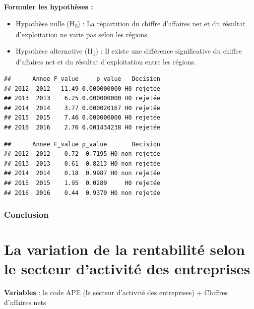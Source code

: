 \documentclass[mstat,12pt]{unswthesis}
\begin{document}
\medskip

\textbf{Formuler les hypothèses :}

\bigskip

\begin{itemize}
\tightlist
\item
  Hypothèse nulle (H\textsubscript{0}) : La répartition du chiffre
  d'affaires net et du résultat d'exploitation ne varie pas selon les
  régions. \medskip
\item
  Hypothèse alternative (H\textsubscript{1}) : Il existe une différence
  significative du chiffre d'affaires net et du résultat d'exploitation
  entre les régions.
\end{itemize}

\begin{verbatim}
##      Annee F_value     p_value   Decision
## 2012  2012   11.49 0.000000000 H0 rejetée
## 2013  2013    6.25 0.000000000 H0 rejetée
## 2014  2014    3.77 0.000020167 H0 rejetée
## 2015  2015    7.46 0.000000000 H0 rejetée
## 2016  2016    2.76 0.001434238 H0 rejetée
\end{verbatim}

\bigskip

\begin{verbatim}
##      Annee F_value p_value       Decision
## 2012  2012    0.72  0.7195 H0 non rejetée
## 2013  2013    0.61  0.8213 H0 non rejetée
## 2014  2014    0.18  0.9987 H0 non rejetée
## 2015  2015    1.95  0.0289     H0 rejetée
## 2016  2016    0.44  0.9379 H0 non rejetée
\end{verbatim}

\subsubsection{Conclusion}\label{conclusion-2}

\newpage

\section{\texorpdfstring{\textbf{La variation de la rentabilité selon le
secteur d'activité des
entreprises}}{La variation de la rentabilité selon le secteur d'activité des entreprises}}\label{la-variation-de-la-rentabilituxe9-selon-le-secteur-dactivituxe9-des-entreprises}

\bigskip

\textbf{Variables} : le code APE (le secteur d'activité des entreprises)
+ Chiffres d'affaires nets
\end{document}

